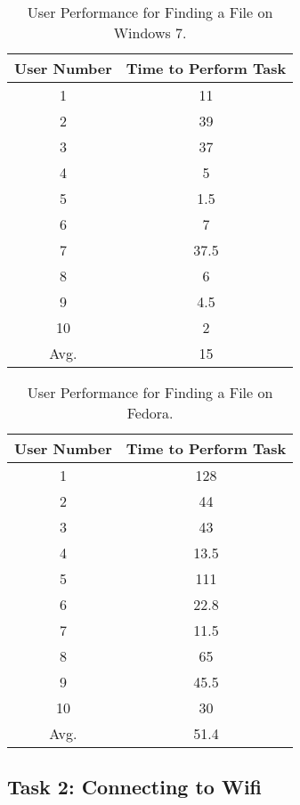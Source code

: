 \documentclass[11pt,letterpaper]{report}
\begin{document}
\begin{table}
    \centering
    \begin{tabular}{| c | c |}
        \hline
        User Number & Time to Perform Task \\ \hline
        1 & 11 \\  \hline
        2 & 39 \\  \hline
        3 & 37 \\ \hline
        4 & 5 \\  \hline
        5 & 1.5 \\    \hline
        6 & 7 \\  \hline
        7 & 37.5 \\ \hline
        8 & 6 \\  \hline
        9 & 4.5 \\ \hline
        10 & 2 \\ \hline
        Avg. & 15 \\
        \hline
    \end{tabular}
    \caption{User Performance for Finding a File on Windows 7.}
    \label{fafW}
\end{table}

\begin{table}
    \centering
    \begin{tabular}{| c | c |}
        \hline
        User Number & Time to Perform Task \\ \hline
        1 & 128 \\  \hline
        2 & 44 \\  \hline
        3 & 43 \\ \hline
        4 & 13.5 \\  \hline
        5 & 111 \\    \hline
        6 & 22.8 \\  \hline
        7 & 11.5 \\ \hline
        8 & 65 \\  \hline
        9 & 45.5 \\ \hline
        10 & 30 \\ \hline
        Avg. & 51.4 \\
        \hline
    \end{tabular}
    \caption{User Performance for Finding a File on Fedora.}
    \label{fafL}    
\end{table}

\subsection{Task 2: Connecting to Wifi}
\end{document}
